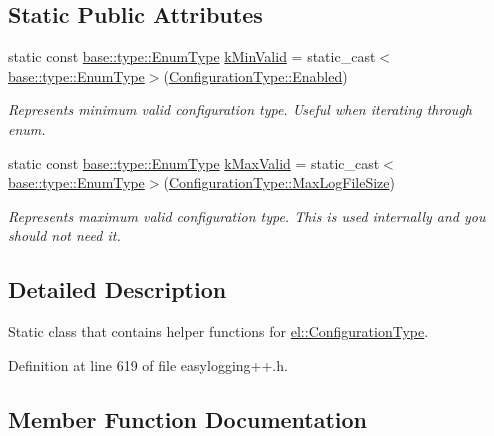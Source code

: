 \subsection*{Static Public Attributes}
\begin{DoxyCompactItemize}
\item 
static const \hyperlink{namespaceel_1_1base_1_1type_afb892a99b7545bf6e45c1e1d84af2ec9}{base\+::type\+::\+Enum\+Type} \hyperlink{classel_1_1_configuration_type_helper_ab7266e698eb32dec2da285325a66e322}{k\+Min\+Valid} = static\+\_\+cast$<$\hyperlink{namespaceel_1_1base_1_1type_afb892a99b7545bf6e45c1e1d84af2ec9}{base\+::type\+::\+Enum\+Type}$>$(\hyperlink{namespaceel_a281f5db6d6163678bc68a8b23b59e124a00d23a76e43b46dae9ec7aa9dcbebb32}{Configuration\+Type\+::\+Enabled})
\begin{DoxyCompactList}\small\item\em Represents minimum valid configuration type. Useful when iterating through enum. \end{DoxyCompactList}\item 
static const \hyperlink{namespaceel_1_1base_1_1type_afb892a99b7545bf6e45c1e1d84af2ec9}{base\+::type\+::\+Enum\+Type} \hyperlink{classel_1_1_configuration_type_helper_aa02f3cefb127e7eb97d7e1dd7f51a12d}{k\+Max\+Valid} = static\+\_\+cast$<$\hyperlink{namespaceel_1_1base_1_1type_afb892a99b7545bf6e45c1e1d84af2ec9}{base\+::type\+::\+Enum\+Type}$>$(\hyperlink{namespaceel_a281f5db6d6163678bc68a8b23b59e124a4b35e615142d60db6383426f051e700b}{Configuration\+Type\+::\+Max\+Log\+File\+Size})
\begin{DoxyCompactList}\small\item\em Represents maximum valid configuration type. This is used internally and you should not need it. \end{DoxyCompactList}\end{DoxyCompactItemize}


\subsection{Detailed Description}
Static class that contains helper functions for \hyperlink{namespaceel_a281f5db6d6163678bc68a8b23b59e124}{el\+::\+Configuration\+Type}. 

Definition at line 619 of file easylogging++.\+h.



\subsection{Member Function Documentation}
\hypertarget{classel_1_1_configuration_type_helper_a62301cbc966cf7e7e2a7b55cc3259996}{}
